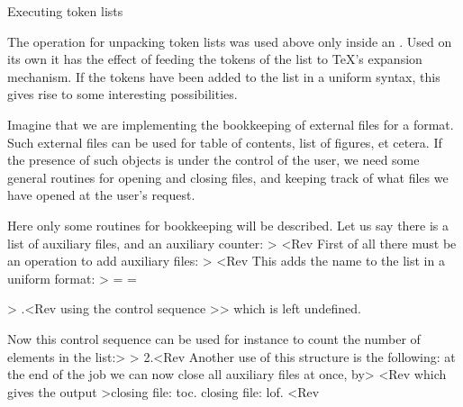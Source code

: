 \spoint Executing token lists

The  operation for unpacking token lists was used above
only inside an . Used on its own it has the effect
of feeding the tokens of the list to \TeX's expansion mechanism.
If the tokens have been added to the list in a uniform syntax,
this gives rise to some interesting possibilities.

Imagine that we are implementing the bookkeeping of external
files for a format. Such external files can be used for
table of contents, list of figures, et cetera.
If the presence
of such objects is under the control of the user, we need some
general routines for opening and closing files, and keeping
track of what files we have opened at the user's request.

Here only  some routines for bookkeeping will be described.
Let us say there is a list of auxiliary files, and an auxiliary
counter: \Ver>
\newtoks\auxlist \newcount\auxcount<Rev
First of all there must be an operation to add auxiliary files:
\Ver>\def\NewAuxFile#1{\AddToAuxList{#1}%
    }
\def\AddToAuxList#1{\let\\=\relax
    \edef\act{\noexpand\auxlist={\the\auxlist \\{#1}}}%
    \act}<Rev
This adds the name to the list in a uniform format:
\Ver>\NewAuxFile{toc} \NewAuxFile{lof}
\showthe\auxlist
> \\{toc}\\{lof}.<Rev
using the control sequence \ver>\\> which is left undefined.

Now this control sequence can be used for instance to
count the number of elements in the list:\Ver>
\def\ComputeLengthOfAuxList{ 
    \def\\##1{\advance\auxcount1\relax}%
    \the\auxlist}
\ComputeLengthOfAuxList \showthe\auxcount
> 2.<Rev
Another use of this structure is the following:
at the end of the job we can now close all auxiliary
files at once, by\Ver>
\def\CloseAuxFiles{\def\\##1{\CloseAuxFile{##1}}%
    \the\auxlist}
\def\CloseAuxFile#1{\message{closing file: #1. }%
    }
\CloseAuxFiles<Rev
which gives the output
\Ver>closing file: toc.  closing file: lof. <Rev

\endinput
\spoint Dynamic macro definition

